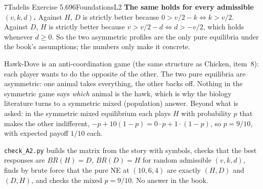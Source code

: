 \begin{exsol}{7}{Tadelis Exercise 5.6}{96}{Foundations}{L2}
\textbf{The same holds for every admissible $(v,k,d)$.} Against $H$, $D$ is strictly better
because $0 > v/2 - k \iff k > v/2$. Against $D$, $H$ is strictly better because
$v > v/2 - d \iff d > -v/2$, which holds whenever $d \ge 0$. So the two asymmetric profiles are the
only pure equilibria under the book's assumptions; the numbers only make it concrete.

\interp Hawk-Dove is an anti-coordination game (the same structure as Chicken, item~8): each
player wants to do the opposite of the other. The two pure equilibria are asymmetric: one animal
takes everything, the other backs off. Nothing in the symmetric game says \emph{which} animal is
the hawk, which is why the biology literature turns to a symmetric mixed (population) answer.
Beyond what is asked: in the symmetric mixed equilibrium each plays $H$ with probability $p$ that
makes the other indifferent, $-p + 10(1-p) = 0\cdot p + 1\cdot(1-p)$, so $p = 9/10$, with expected
payoff $1/10$ each.

\verify \texttt{check\_A2.py} builds the matrix from the story with symbols, checks that the
best responses are $BR(H) = D$, $BR(D) = H$ for random admissible $(v,k,d)$, finds by brute force
that the pure NE at $(10,6,4)$ are exactly $(H,D)$ and $(D,H)$, and checks the mixed $p = 9/10$.
No answer in the book.

\end{exsol}
